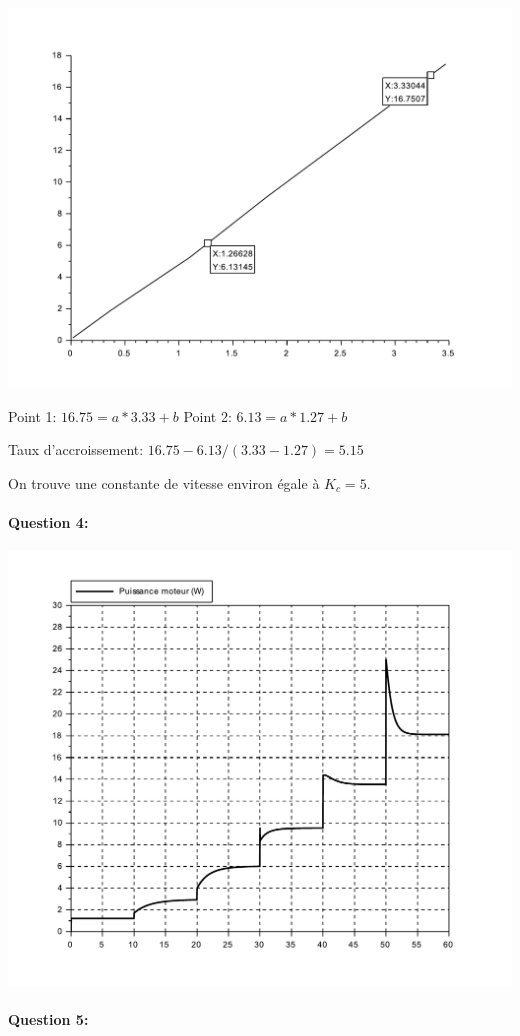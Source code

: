 \begin{center}
 \includegraphics[width=0.8\linewidth]{img/calcul_ke}
\end{center}

Point 1: $16.75=a*3.33+b$
Point 2: $6.13=a*1.27+b$

Taux d'accroissement: $16.75-6.13/(3.33-1.27)=5.15$

On trouve une constante de vitesse environ égale à $K_c=5$.

\paragraph{Question 4:}

\begin{center}
 \includegraphics[width=0.8\linewidth]{img/Puissance_moteur}
\end{center}

\paragraph{Question 5:}

